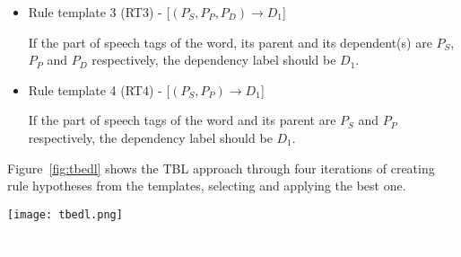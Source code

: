 \begin{itemize}
    If the part of speech tags of the word and its parent are $P_S$ and $P_P$, and the lemma of the word and its parent are $L_S$ and $L_P$ respectively, the dependency label should be $D_1$. %
    
    \item Rule template 3 (RT3) - [${(P_S, P_P, P_D) \rightarrow  D_1 } $]
    
    If the part of speech tags of the word, its parent and its dependent(s) are $P_S$, $P_P$ and $P_D$ respectively, the dependency label should be $D_1$.
    
    \item Rule template 4 (RT4) - [${(P_S, P_P) \rightarrow D_1   }$]
    
    If the part of speech tags of the word and its parent are $P_S$ and $P_P$ respectively, the dependency label should be $D_1$.

\end{itemize}

Figure~\ref{fig:tbedl} shows the TBL approach through four iterations of creating rule hypotheses from the templates, selecting and applying the best one.

\begin{figure*}
    \centering
    \texttt{[image: tbedl.png]}
    \centering
    \caption{Reducing dependency label errors via transformation-based error-driven learning\textcolor{white}{try this}}
    \label{fig:tbedl}
\end{figure*}

\textcolor{white}{try this}

